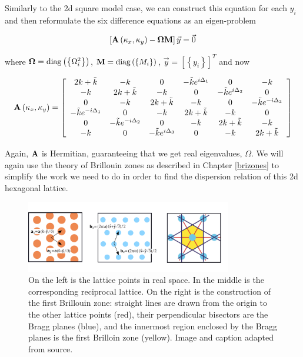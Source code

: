 Similarly to the 2d square model case, we can construct this equation for each
$y_i$ and then reformulate the six difference equations as an eigen-problem

\begin{align}
  \left[\mathbf{A}\left(\kappa_{x},\kappa_{y}\right)-\mathbf{\Omega}\mathbf{M}\right]\vec{y}=\vec{0}
\label{eq:hexeig}
\end{align}

where $\mathbf{\Omega}=\operatorname{diag}\left(\left\{\Omega_i^2\right\}\right)$,
$\mathbf{M}=\operatorname{diag}\left(\left\{M_i\right\}\right)$,
$\vec{y}=\left[\left\{y_i\right\}\right]^T$ and now

\begin{align}
  \mathbf{A}\left(\kappa_{x},\kappa_{y}\right)=\left[
\begin{array}{cccccc}
2k+\tilde{k} & -k & 0 & -\tilde{k}e^{i\Delta_1} & 0 & -k\\
-k & 2k+\tilde{k} & -k & 0 & -\tilde{k}e^{i\Delta_2} & 0\\
0 & -k & 2k +\tilde{k} & -k & 0 & -\tilde{k}e^{-i\Delta_3}\\
-\tilde{k}e^{-i\Delta_1} & 0 & -k & 2k+\tilde{k} & -k & 0\\
0 & -\tilde{k}e^{-i\Delta_2} & 0 & -k & 2k+\tilde{k} & -k\\
-k & 0 & -\tilde{k}e^{i\Delta_3} & 0 & -k & 2k+\tilde{k}
\end{array}\right]
\end{align}

Again, $\mathbf{A}$ is Hermitian, guaranteeing that we get real eigenvalues,
$\Omega$. We will again use the theory of Brillouin zones as described in
Chapter \ref{brizones} to simplify the work we need to do in order to find the
dispersion relation of this 2d hexagonal lattice.

\begin{figure}[!h]
\centering
\includegraphics[width=0.8\textwidth]{imgs/bzonehexown.png}
\caption{\label{fig:bzonehex} On the left is the lattice points in real space.
    In the middle is the corresponding reciprocal lattice. On the right is the
    construction of the first Brillouin zone: straight lines are drawn from the
    origin to the other lattice points (red), their perpendicular bisectors are
    the Bragg planes (blue), and the innermost region enclosed by the Bragg
    planes is the first Brilloin zone (yellow). Image and caption adapted from
    source.\cite{moldinglight}}
\end{figure}

